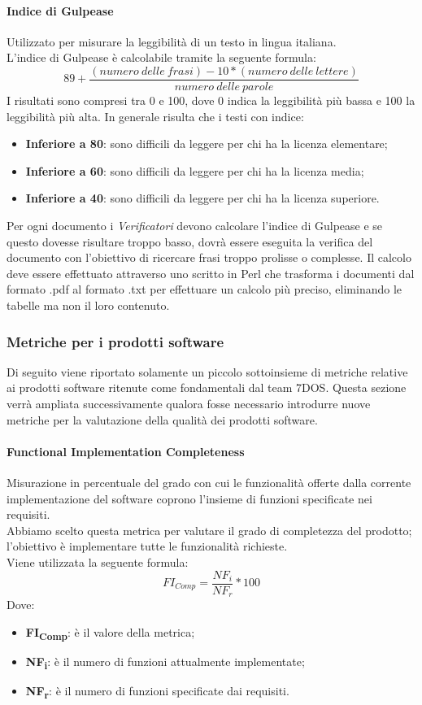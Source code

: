 \paragraph{Indice di Gulpease}\Spazio
Utilizzato per misurare la leggibilità di un testo in lingua italiana.\\
L'indice di Gulpease è calcolabile tramite la seguente formula:
$$
89+\frac{(numero\:delle\:frasi)-10*(numero\:delle\:lettere)}{numero\:delle\:parole}
$$
I risultati sono compresi tra 0 e 100, dove 0 indica la leggibilità più bassa e 100 la leggibilità più alta. In generale risulta che i testi con indice:
\begin{itemize}
	\item{\textbf{Inferiore	a 80}}: sono difficili da leggere per chi ha la licenza elementare;
	\item{\textbf{Inferiore	a 60}}: sono difficili da leggere per chi ha la licenza media;
	\item{\textbf{Inferiore	a 40}}: sono difficili da leggere per chi ha la licenza superiore.
\end{itemize}
Per ogni documento i \emph{Verificatori} devono calcolare l'indice di Gulpease e se questo dovesse risultare troppo basso, dovrà essere eseguita la verifica del documento con l'obiettivo di ricercare frasi troppo prolisse o complesse. Il calcolo deve essere effettuato attraverso uno  scritto in Perl che trasforma i documenti dal formato .pdf al formato .txt per effettuare un calcolo più preciso, eliminando le tabelle ma non il loro contenuto.


\subsubsection{Metriche per i prodotti software}
Di seguito viene riportato solamente un piccolo sottoinsieme di metriche relative ai prodotti software ritenute come fondamentali dal team 7DOS.
Questa sezione verrà ampliata successivamente qualora fosse necessario introdurre nuove metriche per la valutazione della qualità dei prodotti software.

\paragraph{Functional Implementation Completeness}\Spazio
Misurazione in percentuale del grado con cui le funzionalità offerte dalla corrente implementazione del software coprono l'insieme di funzioni specificate nei requisiti.\\
Abbiamo scelto questa metrica per valutare il grado di completezza del prodotto; l'obiettivo è implementare tutte le funzionalità richieste.\\
Viene utilizzata la seguente formula:
$$FI_{Comp}=\frac{NF_i}{NF_r}*100$$
Dove:
\begin{itemize}
	\item{\textbf{FI\textsubscript{Comp}}: è il valore della metrica;}
	\item{\textbf{NF\textsubscript{i}}: è il numero di funzioni attualmente implementate;}
	\item{\textbf{NF\textsubscript{r}}: è il numero di funzioni specificate dai requisiti.}
\end{itemize}

